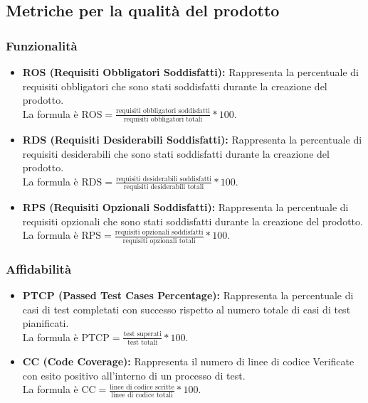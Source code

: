 \subsection{Metriche per la qualità del prodotto}
\subsubsection{Funzionalità}
\begin{itemize}
    \item \textbf{ROS (Requisiti Obbligatori Soddisfatti):} Rappresenta la percentuale di requisiti obbligatori che sono stati soddisfatti durante la creazione del prodotto.\\
    La formula è \( \text{ROS} = \frac{\text{requisiti obbligatori soddisfatti}}{\text{requisiti obbligatori totali}}*100 \).
    \item \textbf{RDS (Requisiti Desiderabili Soddisfatti):} Rappresenta la percentuale di requisiti desiderabili che sono stati soddisfatti durante la creazione del prodotto.\\
    La formula è \( \text{RDS} = \frac{\text{requisiti desiderabili soddisfatti}}{\text{requisiti desiderabili totali}}*100 \).
    \item \textbf{RPS (Requisiti Opzionali Soddisfatti):} Rappresenta la percentuale di requisiti opzionali che sono stati soddisfatti durante la creazione del prodotto.\\
    La formula è \( \text{RPS} = \frac{\text{requisiti opzionali soddisfatti}}{\text{requisiti opzionali totali}}*100 \).
\end{itemize}

\subsubsection{Affidabilità}
\begin{itemize}
    \item \textbf{PTCP (Passed Test Cases Percentage):} Rappresenta la percentuale di casi di test completati con successo rispetto al numero totale di casi di test pianificati.\\
    La formula è \( \text{PTCP} = \frac{\text{test superati}}{\text{test totali}}*100 \).
    \item \textbf{CC (Code Coverage):} Rappresenta il numero di linee di codice Verificate con esito positivo all'interno di un processo di test.\\
    La formula è \( \text{CC} = \frac{\text{linee di codice scritte}}{\text{linee di codice totali}}*100 \).
\end{itemize}

